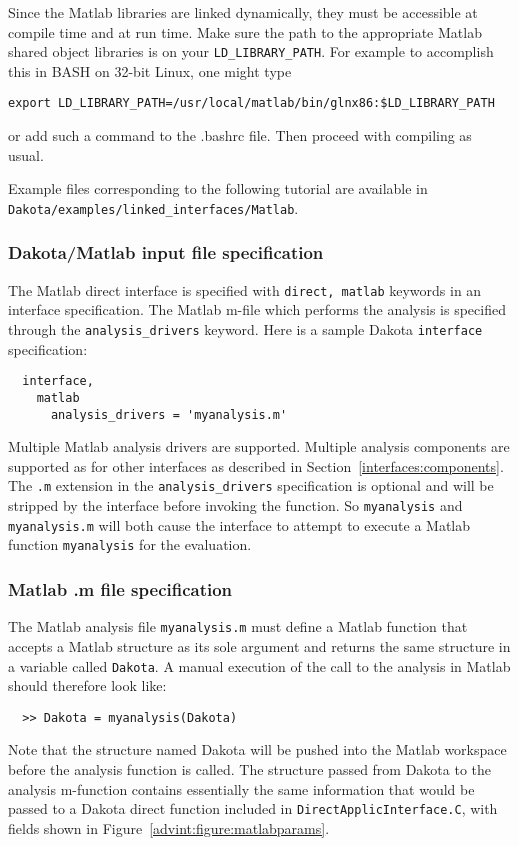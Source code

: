 Since the Matlab libraries are linked dynamically, they must be
accessible at compile time and at run time. Make sure the path to the
appropriate Matlab shared object libraries is on your 
{\tt LD\_LIBRARY\_PATH}. For example to accomplish this in BASH on
32-bit Linux, one might type
\begin{verbatim}
export LD_LIBRARY_PATH=/usr/local/matlab/bin/glnx86:$LD_LIBRARY_PATH
\end{verbatim}
or add such a command to the .bashrc file. Then proceed with
compiling as usual.

Example files corresponding to the following tutorial are available in \\ 
{\tt Dakota/examples/linked\_interfaces/Matlab}.

\subsubsection{Dakota/Matlab input file specification}

The Matlab direct interface is specified with {\tt direct, matlab}
keywords in an interface specification. The Matlab m-file which
performs the analysis is specified through the {\tt analysis\_drivers}
keyword. Here is a sample Dakota {\tt interface} specification:
\begin{small}
\begin{verbatim}
  interface,
    matlab
      analysis_drivers = 'myanalysis.m'
\end{verbatim} 
\end{small}

Multiple Matlab analysis drivers are supported. Multiple analysis
components are supported as for other interfaces as described in
Section~\ref{interfaces:components}. The {\tt .m} extension in the
{\tt analysis\_drivers} specification is optional and will be stripped
by the interface before invoking the function. So {\tt myanalysis}
and {\tt myanalysis.m} will both cause the interface to attempt to
execute a Matlab function {\tt myanalysis} for the evaluation.

\subsubsection{Matlab .m file specification}

The Matlab analysis file {\tt myanalysis.m} must define a Matlab
function that accepts a Matlab structure as its sole argument and
returns the same structure in a variable called {\tt Dakota}. A
manual execution of the call to the analysis in Matlab should
therefore look like:
\begin{small}
\begin{verbatim}
  >> Dakota = myanalysis(Dakota)
\end{verbatim} 
\end{small}
Note that the structure named Dakota will be pushed into the Matlab
workspace before the analysis function is called. The structure
passed from Dakota to the analysis m-function contains essentially the
same information that would be passed to a Dakota direct function
included in {\tt DirectApplicInterface.C}, with fields shown in
Figure~\ref{advint:figure:matlabparams}.

